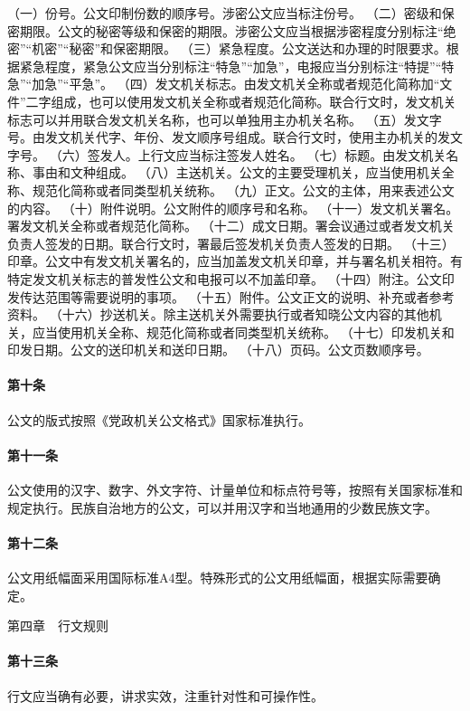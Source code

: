 \documentclass{gbt9704}
\begin{document}
（一）份号。公文印制份数的顺序号。涉密公文应当标注份号。
（二）密级和保密期限。公文的秘密等级和保密的期限。涉密公文应当根据涉密程度分别标注“绝密”“机密”“秘密”和保密期限。
（三）紧急程度。公文送达和办理的时限要求。根据紧急程度，紧急公文应当分别标注“特急”“加急”，电报应当分别标注“特提”“特急”“加急”“平急”。
（四）发文机关标志。由发文机关全称或者规范化简称加“文件”二字组成，也可以使用发文机关全称或者规范化简称。联合行文时，发文机关标志可以并用联合发文机关名称，也可以单独用主办机关名称。
（五）发文字号。由发文机关代字、年份、发文顺序号组成。联合行文时，使用主办机关的发文字号。
（六）签发人。上行文应当标注签发人姓名。
（七）标题。由发文机关名称、事由和文种组成。
（八）主送机关。公文的主要受理机关，应当使用机关全称、规范化简称或者同类型机关统称。
（九）正文。公文的主体，用来表述公文的内容。
（十）附件说明。公文附件的顺序号和名称。
（十一）发文机关署名。署发文机关全称或者规范化简称。
（十二）成文日期。署会议通过或者发文机关负责人签发的日期。联合行文时，署最后签发机关负责人签发的日期。
（十三）印章。公文中有发文机关署名的，应当加盖发文机关印章，并与署名机关相符。有特定发文机关标志的普发性公文和电报可以不加盖印章。
（十四）附注。公文印发传达范围等需要说明的事项。
（十五）附件。公文正文的说明、补充或者参考资料。
（十六）抄送机关。除主送机关外需要执行或者知晓公文内容的其他机关，应当使用机关全称、规范化简称或者同类型机关统称。
（十七）印发机关和印发日期。公文的送印机关和送印日期。
（十八）页码。公文页数顺序号。
\paragraph{第十条}
公文的版式按照《党政机关公文格式》国家标准执行。

\paragraph{第十一条}
公文使用的汉字、数字、外文字符、计量单位和标点符号等，按照有关国家标准和规定执行。民族自治地方的公文，可以并用汉字和当地通用的少数民族文字。

\paragraph{第十二条}
公文用纸幅面采用国际标准A4型。特殊形式的公文用纸幅面，根据实际需要确定。


第四章　行文规则


\paragraph{第十三条}
行文应当确有必要，讲求实效，注重针对性和可操作性。
\end{document}
